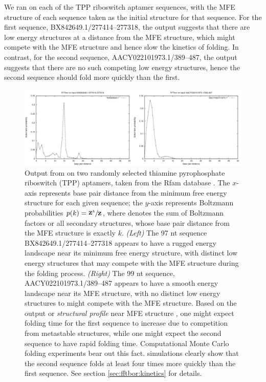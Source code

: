 We ran \fftbor on each of the TPP riboswitch aptamer
sequences, with the MFE structure of each
sequence taken as the initial structure \strSt for that sequence. For the
first sequence, BX842649.1/277414--277318, the \fftbor output
suggests that there are low energy structures
at a distance from the MFE structure, which might compete with the MFE
structure and hence slow the kinetics of folding. In contrast, for the
second sequence, AACY022101973.1/389--487, the \fftbor output suggests
that there are no such competing low energy structures, hence
the second sequence should fold more quickly than the first.

\begin{figure}[!ht]
\centering
\includegraphics[width=.9\textwidth]{Figures/FFTbor/tppDistributions.pdf}
\caption{Output from \fftbor on two randomly selected
thiamine pyrophosphate riboswitch (TPP) aptamers, taken from the Rfam database
\citep{Gardner.nar11}. The $x$-axis represents base pair distance from the
minimum free energy structure for each given sequence; the $y$-axis represents
Boltzmann probabilities $p(k) = \sfrac{{\bf Z}^{k}_{}}{{\bf Z}^{}_{}}$, where
 denotes the sum of Boltzmann factors or all secondary structures,
whose base pair distance from the MFE structure is exactly $k$.
{\em (Left)}
The 97 nt sequence BX842649.1/277414--277318 appears to have a rugged energy
landscape near its minimum free energy structure, with distinct
low energy structures that may compete with the MFE structure during the
folding process.
{\em (Right)}
The 99 nt sequence, AACY022101973.1/389--487 appears to have a smooth energy
landscape near its MFE structure, with no distinct low energy structures
to might compete with the MFE structure.
Based on the \fftbor output or {\em structural profile} near MFE
structure \strSt, one might expect
folding time for the first sequence to increase due to competition from
metastable structures, while one might expect the second sequence to have
rapid folding time.
Computational Monte Carlo folding experiments bear out this fact.
\kinfold \citep{flamm} simulations clearly show that the second
sequence folds
at least four times more quickly than the first sequence. See section
\ref{sec:fftbor:kinetics} for
details.}
\label{fig:fftbor:tppDistributions}
\end{figure}

